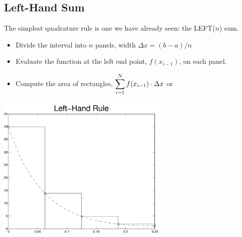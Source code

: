 \newpage

\subsection*{Left-Hand Sum}
The simplest quadrature rule is one we have already seen: the LEFT($n$) sum.
\begin{itemize}
\item Divide the interval into $n$ panels, width $\Delta x = (b-a) / n$
\item Evaluate the function at the left end point, $f(x_{i-1})$, on
  each panel.
\item Compute the area of rectangles, $\displaystyle \sum_{i=1}^N f(x_{i-1}) \cdot \Delta x$ or
\end{itemize}
\begin{center}
\includegraphics[height=7cm]{graphics/notes_06_f_left_hand_rule}
\end{center}

\newpage


